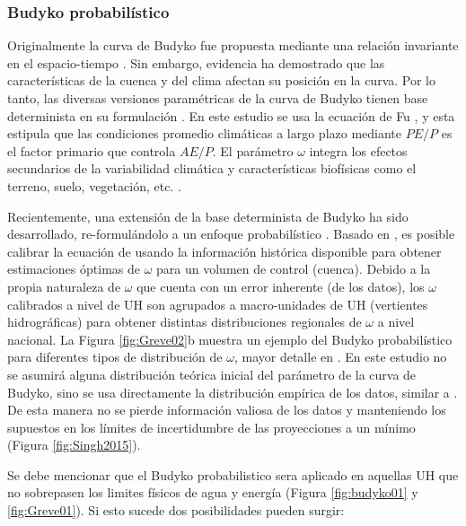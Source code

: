 \documentclass[12pt]{article}
\begin{document}
\subsubsection{Budyko probabilístico}

Originalmente la curva de Budyko fue propuesta mediante una relación invariante en el espacio-tiempo \citep{schreiber1904relationship,ol1911evaporation,budyko1958heat}. Sin embargo, evidencia ha demostrado que las características de la cuenca y del clima afectan su posición en la curva. Por lo tanto, las diversas versiones paramétricas de la curva de Budyko tienen base determinista en su formulación \citep{Fu1981,Koster1999,zhang2001response,zhou2015complementary,Wang2014,Zhang2004,Zhang2008,fathi2019new}. En este estudio se usa la ecuación de Fu \citep[Ecuación \ref{equ:fuEqu} y Figura \ref{fig:Greve01};][]{Fu1981}, y esta estipula que las condiciones promedio climáticas a largo plazo mediante $PE/P$ es el factor primario que controla $AE/P$. El parámetro $\omega$ integra los efectos secundarios de la variabilidad climática y características biofísicas como el terreno, suelo, vegetación, etc. \citep{Gentine2012,Berghuijs2014,Greve2015}.

Recientemente, una extensión de la base determinista de Budyko ha sido desarrollado, re-formulándolo a un enfoque probabilístico \citep{Greve2015}. Basado en \citet{Greve2015}, es posible calibrar la ecuación de \cite{Fu1981} usando la información histórica disponible para obtener estimaciones óptimas de $\omega$ para un volumen de control (cuenca). Debido a la propia naturaleza de $\omega$ que cuenta con un error inherente (de los datos), los $\omega$ calibrados a nivel de UH son agrupados a macro-unidades de UH (vertientes hidrográficas) para obtener distintas distribuciones regionales de $\omega$ a nivel nacional. La Figura \ref{fig:Greve02}b muestra un ejemplo del Budyko probabilístico para diferentes tipos de distribución de $\omega$, mayor detalle en \citet{Greve2015}. En este estudio no se asumirá alguna distribución teórica inicial del parámetro de la curva de Budyko, sino se usa directamente la distribución empírica de los datos, similar a \citet{Singh2015}. De esta manera no se pierde información valiosa de los datos y manteniendo los supuestos en los límites de incertidumbre de las proyecciones a un mínimo (Figura \ref{fig:Singh2015}).

Se debe mencionar que el Budyko probabilistico sera aplicado en aquellas UH que no sobrepasen los limites físicos de agua y energía (Figura \ref{fig:budyko01} y \ref{fig:Greve01}). Si esto sucede dos posibilidades pueden surgir: 
\end{document}
